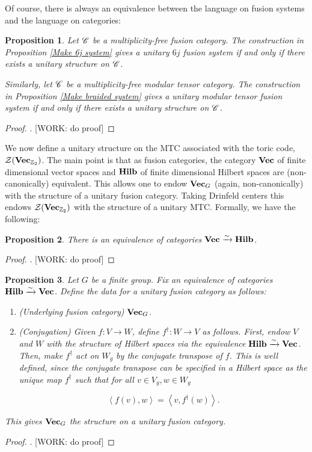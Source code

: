 \documentclass{article}
\newtheorem{proposition}{Proposition}[section]
\theoremstyle{definition}
\numberwithin{figure}{section}
\begin{document}
Of course, there is always an equivalence between the language on fusion systems and the language on categories:

\begin{proposition} Let $\mathscr{C}$ be a multiplicity-free fusion category. The construction in Proposition \ref{Make 6j system} gives a unitary $6j$ fusion system if and only if there exists a unitary structure on $\mathscr{C}$.

Similarly, let $\mathscr{C}$ be a multiplicity-free modular tensor category. The construction in Proposition \ref{Make braided system} gives a unitary modular tensor fusion system if and only if there exists a unitary structure on $\mathscr{C}$.
\end{proposition}
\begin{proof}. [WORK: do proof]
\end{proof}

We now define a unitary structure on the MTC associated with the toric code, $\mathcal{Z}(\bold{Vec}_{\mathbb{Z}_2})$. The main point is that as fusion categories, the category $\bold{Vec}$ of finite dimensional vector spaces and $\bold{Hilb}$ of finite dimensional Hilbert spaces are (non-canonically) equivalent. This allows one to endow $\bold{Vec}_{G}$ (again, non-canonically) with the structure of a unitary fusion category. Taking Drinfeld centers this endows $\mathcal{Z}(\bold{Vec}_{\mathbb{Z}_2})$ with the structure of a unitary MTC. Formally, we have the following:

\begin{proposition} There is an equivalence of categories $\bold{Vec}\xrightarrow{\sim}\bold{Hilb}$.
\end{proposition}
\begin{proof}. [WORK: do proof]
\end{proof}

\begin{proposition} Let $G$ be a finite group. Fix an equivalence of categories $\bold{Hilb}\xrightarrow{\sim}\bold{Vec}$. Define the data for a unitary fusion category as follows:

\begin{enumerate}
\item (Underlying fusion category) $\bold{Vec}_{G}$.
\item (Conjugation) Given $f:V\to W$, define $f^{\dagger}:W\to V$ as follows. First, endow $V$ and $W$ with the structure of Hilbert spaces via the equivalence $\bold{Hilb}\xrightarrow{\sim}\bold{Vec}$. Then, make $f^{\dagger}$ act on $W_g$ by the conjugate transpose of $f$. This is well defined, since the conjugate transpose can be specified in a Hilbert space as the unique map $f^{\dagger}$ such that for all $v\in V_g, w\in W_g$

$$\left<f(v),w\right>=\left<v,f^{\dagger}(w)\right>.$$

\end{enumerate}

This gives $\bold{Vec}_G$ the structure on a unitary fusion category.
\end{proposition}
\begin{proof}. [WORK: do proof]
\end{proof}
\end{document}
